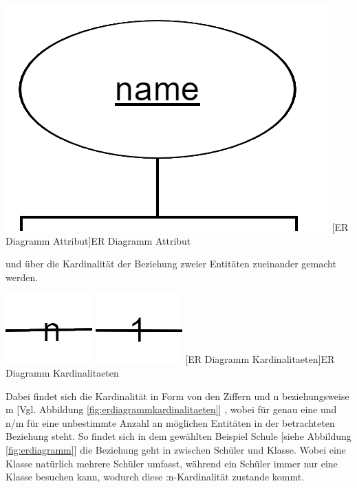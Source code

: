 \documentclass[12pt,a4paper,bibliography=totocnumbered,listof=totocnumbered]{scrartcl}
\begin{document}
\begin{minipage}{\linewidth}
\vspace{1em}
\begin{minipage}{\linewidth}
	\centering
	\includegraphics[width=0.6\linewidth]{Bilder/erd-attribut.png}
	[ER Diagramm Attribut]{ER Diagramm Attribut}
	\label{fig:erdiagrammattribut}
\end{minipage}
 

und über die Kardinalität der Beziehung zweier Entitäten zueinander gemacht werden.

\vspace{1em}
\begin{minipage}{\linewidth}
	\centering
	\includegraphics[width=0.2\linewidth]{Bilder/erd-kardinalitaet1.png}
	\includegraphics[width=0.2\linewidth]{Bilder/erd-kardinalitaet2.png}
	[ER Diagramm Kardinalitaeten]{ER Diagramm Kardinalitaeten}
	\label{fig:erdiagrammkardinalitaeten}
\end{minipage}


Dabei findet sich die Kardinalität in Form von den Ziffern \grqq{} und \glqq n\grqq{} beziehungsweise \glqq m\grqq{} [Vgl. Abbildung \ref{fig:erdiagrammkardinalitaeten}]
, wobei \grqq{} für genau eine und \glqq n\grqq{}/\glqq m\grqq{} für eine unbestimmte Anzahl an möglichen Entitäten in der betrachteten Beziehung steht.
So findet sich in dem gewählten Beispiel Schule [siehe Abbildung \ref{fig:erdiagramm}]
die Beziehung \glqq geht in\grqq{} zwischen Schüler und Klasse. Wobei eine Klasse natürlich mehrere Schüler umfasst, während ein Schüler immer nur eine Klasse besuchen kann, wodurch diese :n-Kardinalität\grqq{} zustande kommt.


\end{minipage}
\end{document}
